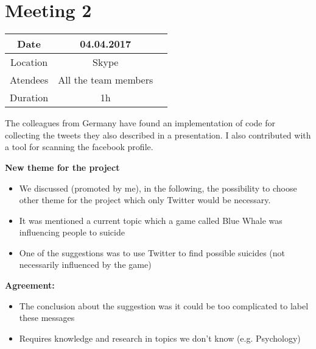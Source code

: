 \section{Meeting 2}
\begin{center}
	\begin{tabular}{| c | c | c }
		\hline
		Date &  04.04.2017\\
		\hline
		Location & Skype  \\
		\hline
		Atendees & All the team members   \\
		\hline
		Duration & 1h  \\
		\hline
	\end{tabular}
\end{center}

The colleagues from Germany have found an implementation of code for collecting the tweets they also  described
in a presentation. I also contributed with a tool for scanning the facebook profile.

\textbf{New theme for the project}
\begin{itemize}
	\item We discussed (promoted by me), in the following,
	the possibility to choose other theme for the project which
	only Twitter would be necessary.
	\item 	It was mentioned a current topic which a game called
	Blue Whale was influencing people to suicide
	\item One of the suggestions was to use Twitter to find
	possible suicides (not necessarily influenced by the game)
\end{itemize}
\textbf{Agreement:}
\begin{itemize}
	\item The conclusion about the suggestion was it could be too
	complicated to label these messages
	\item Requires knowledge and research in topics we don't
	know (e.g. Psychology)
\end{itemize}


